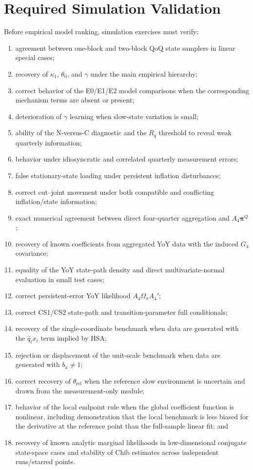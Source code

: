 \documentclass[11pt]{article}
\begin{document}
\section{Required Simulation Validation}

Before empirical model ranking, simulation exercises must verify:
\begin{enumerate}
\item agreement between one-block and two-block QoQ state samplers in linear special cases;
\item recovery of $\kappa_1$, $\theta_0$, and $\gamma$ under the main empirical hierarchy;
\item correct behavior of the E0/E1/E2 model comparisons when the corresponding mechanism terms are absent or present;
\item deterioration of $\gamma$ learning when slow-state variation is small;
\item ability of the N-versus-C diagnostic and the $R_q$ threshold to reveal weak quarterly information;
\item behavior under idiosyncratic and correlated quarterly measurement errors;
\item false stationary-state loading under persistent inflation disturbances;
\item correct cut--joint movement under both compatible and conflicting inflation/state information;
\item exact numerical agreement between direct four-quarter aggregation and $A_4\bm\pi^Q$;
\item recovery of known coefficients from aggregated YoY data with the induced $G_4$ covariance;
\item equality of the YoY state-path density and direct multivariate-normal evaluation in small test cases;
\item correct persistent-error YoY likelihood $A_4\Omega_{\pi}A_4'$;
\item correct CS1/CS2 state-path and transition-parameter full conditionals;
\item recovery of the single-coordinate benchmark when data are generated with the $\hat q_tx_t$ term implied by HSA;
\item rejection or displacement of the unit-scale benchmark when data are generated with $b_x\neq1$;
\item correct recovery of $\theta_{\mathrm{ref}}$ when the reference slow environment is uncertain and drawn from the measurement-only module;
\item behavior of the local endpoint rule when the global coefficient function is nonlinear, including demonstration that the local benchmark is less biased for the derivative at the reference point than the full-sample linear fit; and
\item recovery of known analytic marginal likelihoods in low-dimensional conjugate state-space cases and stability of Chib estimates across independent runs/starred points.
\end{enumerate}
\end{document}
